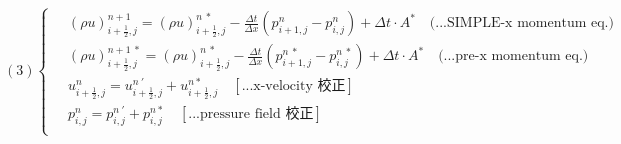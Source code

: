 \documentclass[12pt]{article}
\begin{document}
\begin{equation}
(3)
\left\{
\begin{aligned}
    \ &(\rho u)_{i+\frac{1}{2},j}^{n+1} = (\rho u)_{i+\frac{1}{2},j}^{n\ *} - \frac{\Delta t}{\Delta x}(p_{i+1,j}^{n} - p_{i,j}^{n}) + \Delta t \cdot A^{*}  \quad \text{(...SIMPLE-x momentum eq.)}\\[1.5ex]
    \ &(\rho u)_{i+\frac{1}{2},j}^{n+1\ *} = (\rho u)_{i+\frac{1}{2},j}^{n\ *} - \frac{\Delta t}{\Delta x}(p_{i+1,j}^{n\ *} - p_{i,j}^{n\ *}) + \Delta t \cdot A^{*}  \quad \text{(...pre-x momentum eq.)}\\[1.5ex]  
    \ &u_{i+\frac{1}{2},j}^{n} = u_{i+\frac{1}{2},j}^{n\ '} + u_{i+\frac{1}{2},j}^{n *}  \quad \left[\text{...x-velocity 校正}\right]\\[1.5ex]
    \ &p_{i,j}^{n} = p_{i,j}^{n\ '} + p_{i,j}^{n *} \quad\left[\text{...pressure field 校正}\right]\\[1.5ex]
\end{aligned}
\right.
\end{equation}

\newpage
\end{document}
